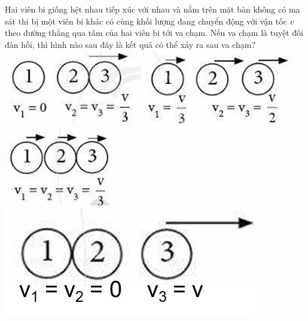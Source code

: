 \begin{ex}
	Hai viên bi giống hệt nhau tiếp xúc với nhau và nằm trên mặt bàn không có ma sát thi bị một viên bi khác có cùng khối lượng đang chuyển động với vận tốc $v$ theo đường thẳng qua tâm của hai viên bi tới va chạm. Nếu va chạm là tuyệt đối đàn hồi, thì hình nào sau đây là kết quả có thể xảy ra sau va chạm?
	\choice
	{\includegraphics[scale=0.6]{../figs/D10-CK2-001-1a}}
	{\includegraphics[scale=0.6]{../figs/D10-CK2-001-1b}}
	{\includegraphics[scale=0.6]{../figs/D10-CK2-001-1c}}
	{\True \includegraphics[scale=0.6]{../figs/D10-CK2-001-1d}}
	\loigiai{}
\end{ex}
